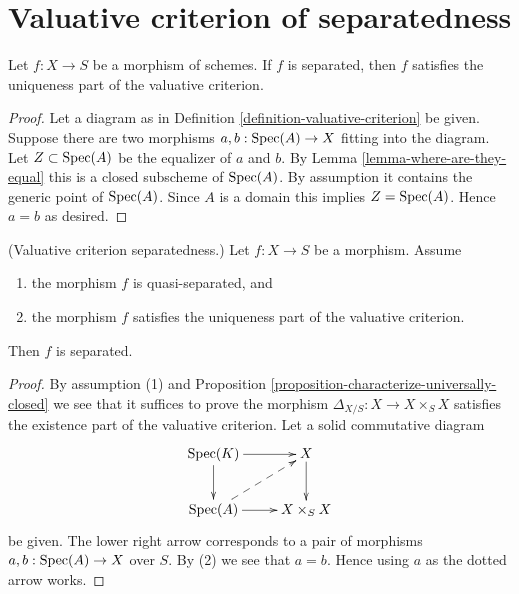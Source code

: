 \section{Valuative criterion of separatedness}
\label{section-valuative-separatedness}

\begin{lemma}
\label{lemma-separated-implies-valuative}
Let $f : X \to S$ be a morphism of schemes.
If $f$ is separated, then $f$ satisfies the uniqueness
part of the valuative criterion.
\end{lemma}

\begin{proof}
Let a diagram as in Definition \ref{definition-valuative-criterion}
be given. Suppose there are two morphisms
$a, b : \mathop{\rm Spec}(A) \to X$ fitting into the diagram.
Let $Z \subset \mathop{\rm Spec}(A)$ be the equalizer of $a$ and $b$.
By Lemma \ref{lemma-where-are-they-equal} this is a closed
subscheme of $\mathop{\rm Spec}(A)$. By assumption it contains
the generic point of $\mathop{\rm Spec}(A)$. Since $A$ is a domain
this implies $Z = \mathop{\rm Spec}(A)$. Hence $a = b$ as desired.
\end{proof}

\begin{lemma}
\label{lemma-valuative-criterion-separatedness}
(Valuative criterion separatedness.)
Let $f : X \to S$ be a morphism.
Assume
\begin{enumerate}
\item the morphism $f$ is quasi-separated, and
\item the morphism $f$ satisfies the uniqueness
part of the valuative criterion.
\end{enumerate}
Then $f$ is separated.
\end{lemma}

\begin{proof}
By assumption (1) and
Proposition \ref{proposition-characterize-universally-closed}
we see that it suffices to prove the morphism
$\Delta_{X/S} : X \to X \times_S X$ satisfies the existence
part of the valuative criterion.
Let a solid commutative diagram
$$
\xymatrix{
\Spec(K) \ar[r] \ar[d] & X \ar[d] \\
\Spec(A) \ar[r] \ar@{-->}[ru] & X \times_S X
}
$$
be given. The lower right arrow corresponds to a
pair of morphisms $a, b : \mathop{\rm Spec}(A) \to X$ over $S$.
By (2) we see that $a = b$. Hence using $a$ as the dotted
arrow works.
\end{proof}





